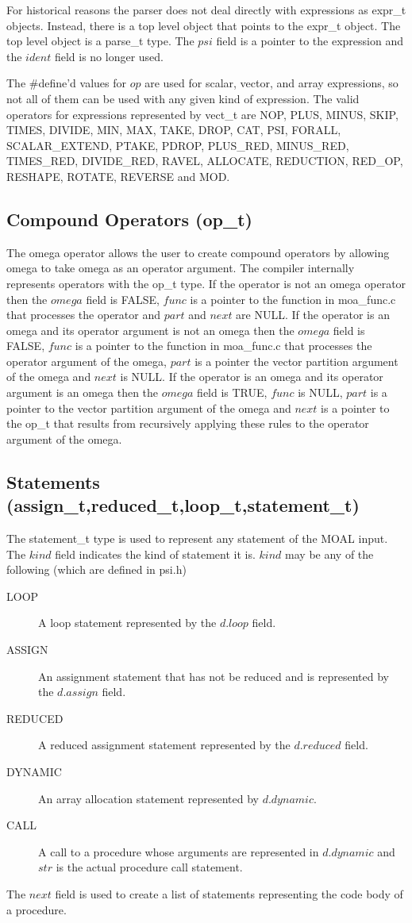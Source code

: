 For historical reasons the parser does not deal directly with expressions
as expr\_t objects.  Instead, there is a top level object that points
to the expr\_t object.  The top level object is a parse\_t type.  The
$psi$ field is a pointer to the expression and the $ident$ field is no
longer used.

The \#define'd values for $op$ are used for scalar, vector, and array 
expressions, so not all of them can be used with any given kind of expression.
The valid operators for expressions represented by vect\_t are
NOP, PLUS, MINUS, SKIP, TIMES, DIVIDE, MIN, MAX,
TAKE, DROP, CAT, PSI, FORALL, SCALAR\_EXTEND, PTAKE, PDROP, PLUS\_RED, 
MINUS\_RED, TIMES\_RED, DIVIDE\_RED, RAVEL, ALLOCATE, REDUCTION, RED\_OP, 
RESHAPE, ROTATE, REVERSE and MOD.

\subsection{Compound Operators (op\_t)}
The omega operator allows the user to create compound operators by allowing
omega to take omega as an operator argument.  The compiler internally 
represents 
operators with the op\_t type.  If the operator is not an omega operator
then the $omega$ field is FALSE, $func$ is a pointer to the function in
moa\_func.c that processes the operator and $part$ and $next$ are NULL.
If the operator is an omega and its operator argument is not an omega then
the $omega$ field is FALSE, $func$ is a pointer to the function in
moa\_func.c that processes the operator argument of the omega, $part$ 
is a pointer the vector partition argument of the omega and $next$ is NULL.
If the operator is an omega and its operator argument is an omega then
the $omega$ field is TRUE, $func$ is NULL, $part$ is a pointer to the
vector partition argument of the omega and $next$ is a pointer to the
op\_t that results from recursively applying these rules to the operator
argument of the omega.

\subsection{Statements (assign\_t,reduced\_t,loop\_t,statement\_t)}
The statement\_t type is used to represent any statement of the MOAL
input.  The $kind$ field indicates the kind of statement it is.
$kind$ may be any of the following (which are defined in psi.h)
\begin{description}
\item[LOOP] A loop statement represented by the $d.loop$ field.
\item[ASSIGN] An assignment statement that has not be reduced and
is represented by the $d.assign$ field.
\item[REDUCED] A reduced assignment statement represented by the 
$d.reduced$ field.
\item[DYNAMIC] An array allocation statement represented by $d.dynamic$.
\item[CALL] A call to a procedure whose arguments are represented in
$d.dynamic$ and $str$ is the actual procedure call statement.
\end{description}
The $next$ field is used to create a list of statements representing the
code body of a procedure.

